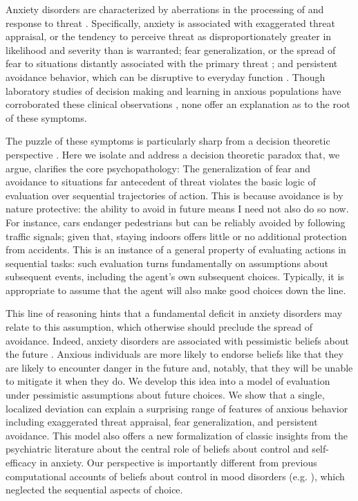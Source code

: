 \documentclass[11pt]{article} %
\begin{document}
Anxiety disorders are characterized by aberrations in the processing of and response to threat \citep{dsm5, ClarkBeck2011}. Specifically, anxiety is associated with exaggerated threat appraisal, or the tendency to perceive threat as disproportionately greater in likelihood and severity than is warranted; fear generalization, or the spread of fear to situations distantly associated with the primary threat \citep{dymond2015}; and persistent avoidance behavior, which can be disruptive to everyday function \citep{Arnaudova2017}. Though laboratory studies of decision making and learning in anxious populations have corroborated these clinical observations \citep{Harle2017, norbury2018, Aylward2019}, none offer an explanation as to the root of these symptoms.


The puzzle of these symptoms is particularly sharp from a decision theoretic perspective \citep{huys2015}. Here we isolate and address a decision theoretic paradox that, we argue, clarifies the core psychopathology: The generalization of fear and avoidance to situations far antecedent of threat violates the basic logic of evaluation over sequential trajectories of action. This is because avoidance is by nature protective: the ability to avoid in future means I need not also do so now. For instance, cars endanger pedestrians but can be reliably avoided by following traffic signals; given that, staying indoors offers little or no additional protection from accidents. This is an instance of a general property of evaluating actions in sequential tasks: such evaluation turns fundamentally on assumptions about subsequent events, including the agent's own subsequent choices. Typically, it is appropriate to assume that the agent will also make good choices down the line.


This line of reasoning hints that a fundamental deficit in anxiety disorders may relate to this assumption, which otherwise should preclude the spread of avoidance. Indeed, anxiety disorders are associated with pessimistic beliefs about the future \citep{ClarkBeck2011}. Anxious individuals are more likely to endorse beliefs like that they are likely to encounter danger in the future and, notably, that they will be unable to mitigate it when they do. We develop this idea into a model of evaluation under pessimistic assumptions about future choices. We show that a single, localized deviation can explain a surprising range of features of anxious behavior including exaggerated threat appraisal, fear generalization, and persistent avoidance. This model also offers a new formalization of classic insights from the psychiatric literature about the central role of beliefs about control and self-efficacy in anxiety. Our perspective is importantly different from previous computational accounts of beliefs about control in mood disorders (e.g. \cite{HuysDayan2009}), which neglected the sequential aspects of choice.
\end{document}
